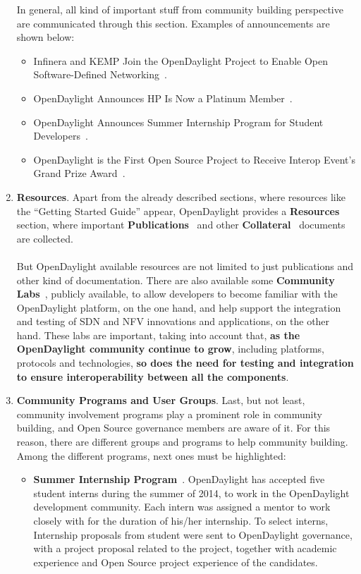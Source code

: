 \documentclass[a4paper, 12pt]{book}
\begin{document}
\begin{enumerate}
\begin{itemize}
\end{itemize}
In general, all kind of important stuff from community building perspective are communicated through this section. Examples of announcements are shown below:
\begin{itemize}\itemsep0pt
\item{Infinera and KEMP Join the OpenDaylight Project to Enable Open Software-Defined Networking}~\cite{OpenDaylightAnnouncement01}.
\item{OpenDaylight Announces HP Is Now a Platinum Member}~\cite{OpenDaylightAnnouncement02}.
\item{OpenDaylight Announces Summer Internship Program for Student Developers}~\cite{OpenDaylightAnnouncement03}.
\item{OpenDaylight is the First Open Source Project to Receive Interop Event’s Grand Prize Award}~\cite{OpenDaylightAnnouncement04}.
\end{itemize}
\item{\textbf{Resources}}. Apart from the already described sections, where resources like the ``Getting Started Guide'' appear, OpenDaylight provides a \textbf{Resources~\cite{OpenDayLightResources}} section, where important \textbf{Publications}~\cite{OpenDaylightPublications} and other \textbf{Collateral}~\cite{OpenDaylightCollateral} documents are collected.\\
\\
But OpenDaylight available resources are not limited to just publications and other kind of documentation. There are also available some \textbf{Community Labs}~\cite{OpenDaylightCommunityLabs}, publicly available, to allow developers to become familiar with the OpenDaylight platform, on the one hand, and help support the integration and testing of SDN and NFV innovations and applications, on the other hand. These labs are important, taking into account that, \textbf{as the OpenDaylight community continue to grow}, including platforms, protocols and technologies, \textbf{so does the need for testing and integration to ensure interoperability between all the components}.
\item{\textbf{Community Programs and User Groups}}. Last, but not least, community involvement programs play a prominent role in community building, and Open Source governance members are aware of it. For this reason, there are different groups and programs to help community building. Among the different programs, next ones must be highlighted:
\begin{itemize}\itemsep0pt
\item{\textbf{Summer Internship Program}~\cite{OpenDaylightInternshipProgram}}. OpenDaylight has accepted five student interns during the summer of 2014, to work in the OpenDaylight development community. Each intern was assigned a mentor to work closely with for the duration of his/her internship. To select interns, Internship proposals from student were sent to OpenDaylight governance, with a project proposal related to the project, together with academic experience and Open Source project experience of the candidates.

\end{itemize}
\end{enumerate}
\end{document}
